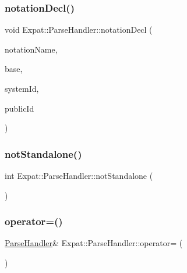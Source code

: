 \subsubsection{\texorpdfstring{notation\+Decl()}{notationDecl()}}
{\footnotesize\ttfamily void Expat\+::\+Parse\+Handler\+::notation\+Decl (\begin{DoxyParamCaption}\item[{const X\+M\+L\+\_\+\+Char $\ast$}]{notation\+Name,  }\item[{const X\+M\+L\+\_\+\+Char $\ast$}]{base,  }\item[{const X\+M\+L\+\_\+\+Char $\ast$}]{system\+Id,  }\item[{const X\+M\+L\+\_\+\+Char $\ast$}]{public\+Id }\end{DoxyParamCaption})\hspace{0.3cm}{\ttfamily [virtual]}}

\hypertarget{class_expat_1_1_parse_handler_afae69dec3184c2cb9265faed9e65fab7}{}\label{class_expat_1_1_parse_handler_afae69dec3184c2cb9265faed9e65fab7} 
\subsubsection{\texorpdfstring{not\+Standalone()}{notStandalone()}}
{\footnotesize\ttfamily int Expat\+::\+Parse\+Handler\+::not\+Standalone (\begin{DoxyParamCaption}{ }\end{DoxyParamCaption})\hspace{0.3cm}{\ttfamily [virtual]}}

\hypertarget{class_expat_1_1_parse_handler_ab294e7d2b95b118a4e7b8d3c3ada78af}{}\label{class_expat_1_1_parse_handler_ab294e7d2b95b118a4e7b8d3c3ada78af} 
\subsubsection{\texorpdfstring{operator=()}{operator=()}}
{\footnotesize\ttfamily \hyperlink{class_expat_1_1_parse_handler}{Parse\+Handler}\& Expat\+::\+Parse\+Handler\+::operator= (\begin{DoxyParamCaption}\item[{const \hyperlink{class_expat_1_1_parse_handler}{Parse\+Handler} \&}]{ }\end{DoxyParamCaption})\hspace{0.3cm}{\ttfamily [delete]}}

